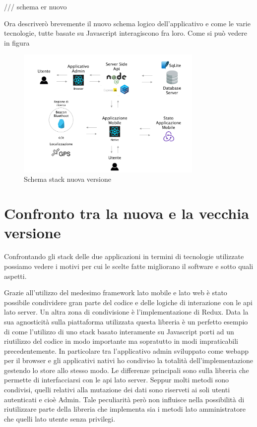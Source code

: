 	/// schema er nuovo
	
	\vspace{5mm}Ora descriverò brevemente il nuovo schema logico dell'applicativo e come le varie tecnologie, tutte basate su Javascript interagiscono fra loro.\vspace{5mm}
	Come si può vedere in figura

\begin{figure}[h]
\centering
\includegraphics[width=0.8\textwidth]{images/stackAlakai.png}
\caption{Schema stack nuova versione}
\end{figure}

\section{Confronto tra la nuova e la vecchia versione}\vspace{5mm}
Confrontando gli stack delle due applicazioni in termini di tecnologie utilizzate possiamo vedere i motivi per cui le scelte fatte migliorano il software e sotto quali aspetti. \vspace{5mm}

Grazie all'utilizzo del medesimo framework lato mobile e lato web è stato possibile condividere gran parte del codice e delle logiche di interazione con le api lato server. Un altra zona di condivisione è l'implementazione di Redux. Data la sua agnosticità sulla piattaforma utilizzata questa libreria è un perfetto esempio di come l'utilizzo di uno stack basato interamente su Javascript porti ad un riutilizzo del codice in modo importante ma sopratutto in modi impraticabili precedentemente. In particolare tra l’applicativo admin sviluppato come webapp per il browser e gli applicativi nativi ho condiviso la totalità dell’implementazione gestendo lo store allo stesso modo. Le differenze principali sono sulla libreria che permette di interfacciarsi con le api lato server. Seppur molti metodi sono condivisi, quelli relativi alla mutazione dei dati sono riserveti ai soli utenti autenticati e cioè Admin. Tale peculiarità però non influisce nella possibilità di riutilizzare parte della libreria che implementa sia i metodi lato amministratore che quelli lato utente senza privilegi.\vspace{5mm} 

